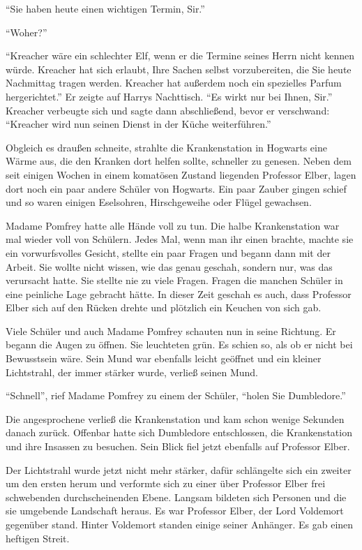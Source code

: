 \enquote{Sie haben heute einen wichtigen Termin, Sir.}

\enquote{Woher\abs?}

\enquote{Kreacher wäre ein schlechter Elf, wenn er die Termine seines Herrn nicht kennen würde. Kreacher hat sich erlaubt, Ihre Sachen selbst vorzubereiten, die Sie heute Nachmittag tragen werden. Kreacher hat außerdem noch ein spezielles Parfum hergerichtet.} Er zeigte auf Harrys Nachttisch. \enquote{Es wirkt nur bei Ihnen, Sir.} Kreacher verbeugte sich und sagte dann abschließend, bevor er verschwand: \enquote{Kreacher wird nun seinen Dienst in der Küche weiterführen.}

\trenn

Obgleich es draußen schneite, strahlte die Krankenstation in Hogwarts eine Wärme aus, die den Kranken dort helfen sollte, schneller zu genesen. Neben dem seit einigen Wochen in einem komatösen Zustand liegenden Professor Elber, lagen dort noch ein paar andere Schüler von Hogwarts. Ein paar Zauber gingen schief und so waren einigen Eselsohren, Hirschgeweihe oder Flügel gewachsen.

Madame Pomfrey hatte alle Hände voll zu tun. Die halbe Krankenstation war mal wieder voll von Schülern. Jedes Mal, wenn man ihr einen brachte, machte sie ein vorwurfsvolles Gesicht, stellte ein paar Fragen und begann dann mit der Arbeit. Sie wollte nicht wissen, wie das genau geschah, sondern nur, was das verursacht hatte. Sie stellte nie zu viele Fragen. Fragen die manchen Schüler in eine peinliche Lage gebracht hätte. In dieser Zeit geschah es auch, dass Professor Elber sich auf den Rücken drehte und plötzlich ein Keuchen von sich gab.

Viele Schüler und auch Madame Pomfrey schauten nun in seine Richtung. Er begann die Augen zu öffnen. Sie leuchteten grün. Es schien so, als ob er nicht bei Bewusstsein wäre. Sein Mund war ebenfalls leicht geöffnet und ein kleiner Lichtstrahl, der immer stärker wurde, verließ seinen Mund.

\enquote{Schnell}, rief Madame Pomfrey zu einem der Schüler, \enquote{holen Sie Dumbledore.}

Die angesprochene verließ die Krankenstation und kam schon wenige Sekunden danach zurück. Offenbar hatte sich Dumbledore entschlossen, die Krankenstation und ihre Insassen zu besuchen. Sein Blick fiel jetzt ebenfalls auf Professor Elber.

Der Lichtstrahl wurde jetzt nicht mehr stärker, dafür schlängelte sich ein zweiter um den ersten herum und verformte sich zu einer über Professor Elber frei schwebenden durchscheinenden Ebene. Langsam bildeten sich Personen und die sie umgebende Landschaft heraus. Es war Professor Elber, der Lord Voldemort gegenüber stand. Hinter Voldemort standen einige seiner Anhänger. Es gab einen heftigen Streit.

